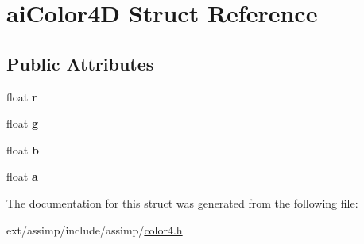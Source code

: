 \hypertarget{structai_color4_d}{\section{ai\-Color4\-D Struct Reference}
\label{structai_color4_d}
}
\subsection*{Public Attributes}
\begin{DoxyCompactItemize}
\item 
\hypertarget{structai_color4_d_a989c2117cfae5a4457fa65f0257e93c7}{float {\bfseries r}}\label{structai_color4_d_a989c2117cfae5a4457fa65f0257e93c7}

\item 
\hypertarget{structai_color4_d_a32e929c7db12fb6f79f74a611f6d8fe6}{float {\bfseries g}}\label{structai_color4_d_a32e929c7db12fb6f79f74a611f6d8fe6}

\item 
\hypertarget{structai_color4_d_ab64376fc730371f8952f5f98084b2430}{float {\bfseries b}}\label{structai_color4_d_ab64376fc730371f8952f5f98084b2430}

\item 
\hypertarget{structai_color4_d_a1bf4f719c14e844dcd7ce5a1c1969c89}{float {\bfseries a}}\label{structai_color4_d_a1bf4f719c14e844dcd7ce5a1c1969c89}

\end{DoxyCompactItemize}


The documentation for this struct was generated from the following file\-:\begin{DoxyCompactItemize}
\item 
ext/assimp/include/assimp/\hyperlink{color4_8h}{color4.\-h}\end{DoxyCompactItemize}
